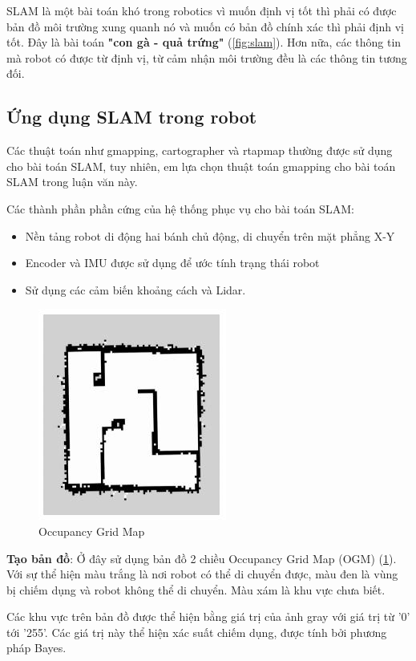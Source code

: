 SLAM là một bài toán khó trong robotics vì muốn định vị tốt thì phải có được bản đồ môi trường xung quanh nó và muốn có bản đồ chính xác thì phải định vị tốt. Đây là bài toán \textbf{"con gà - quả trứng"} (\figurename{\ref{fig:slam}}). Hơn nữa, các thông tin mà robot có được từ định vị, từ cảm nhận môi trường đều là các thông tin tương đối.

\subsection{Ứng dụng SLAM trong robot}
Các thuật toán như gmapping, cartographer và rtapmap thường được sử dụng cho bài toán SLAM, tuy nhiên, em lựa chọn thuật toán gmapping cho bài toán SLAM trong luận văn này. 

Các thành phần phần cứng của hệ thống phục vụ cho bài toán SLAM:
\begin{itemize}
	\item Nền tảng robot di động hai bánh chủ động, di chuyển trên mặt phẳng X-Y
	\item Encoder và IMU được sử dụng để ước tính trạng thái robot
	\item Sử dụng các cảm biến khoảng cách và Lidar.
\end{itemize}
\begin{figure}[tph]
	\centering
	\includegraphics[width=0.4\linewidth]{chapter2/figs/OGM}
	\caption{Occupancy Grid Map}
	\label{fig:ogm}
\end{figure}

\textbf{Tạo bản đồ}: Ở đây sử dụng bản đồ 2 chiều Occupancy Grid Map (OGM)
 (\figurename{\ref{fig:ogm}}). Với sự thể hiện màu trắng là nơi robot có thể di chuyển được, màu đen là vùng bị chiếm dụng và robot không thể di chuyển. Màu xám là khu vực chưa biết. 
 
 Các khu vực trên bản đồ được thể hiện bằng giá trị của ảnh gray với giá trị từ '0' tới '255'. Các giá trị này thể hiện xác suất  chiếm dụng, được tính bởi phương pháp Bayes. 
 
